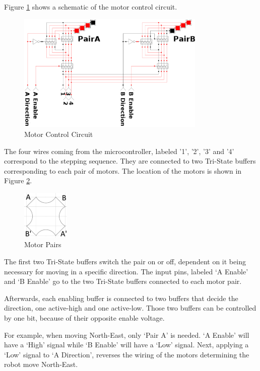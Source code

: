Figure \ref{fig:mot_ctrl} shows a schematic of the motor control circuit.
\begin{figure}[htp]
	\centering
	\includegraphics[width=0.8\textwidth]{figures/move/direction_choice}
	\caption{Motor Control Circuit}
	\label{fig:mot_ctrl}
\end{figure}

The four wires coming from the microcontroller,
labeled '1', '2', '3' and '4' correspond to the stepping sequence.
They are connected to two Tri-State buffers corresponding to each pair of motors.
The location of the motors is shown in Figure \ref{fig:motor_pairs_location}.

\begin{figure}[htp]
	\centering
	\includegraphics[width=0.2\textwidth]{figures/move/Motor_pairs_location.jpg}
	\caption{Motor Pairs}
	\label{fig:motor_pairs_location}
\end{figure}

\clearpage
The first two Tri-State buffers switch the pair on or off,
dependent on it being necessary for moving in a specific direction.
The input pins, labeled ‘A Enable’ and ‘B Enable’ go to the 
two Tri-State buffers connected to each motor pair. 

Afterwards, each enabling buffer is connected to two buffers that decide the direction,
one active-high and one active-low.
Those two buffers can be controlled by one bit,
because of their opposite enable voltage.

For example, when moving North-East, only ‘Pair A’ is needed.
‘A Enable’ will have a ‘High’ signal while ‘B Enable’ will have a ‘Low’ signal.
Next, applying a ‘Low’ signal to ‘A Direction’, 
reverses the wiring of the motors determining the robot move North-East.

